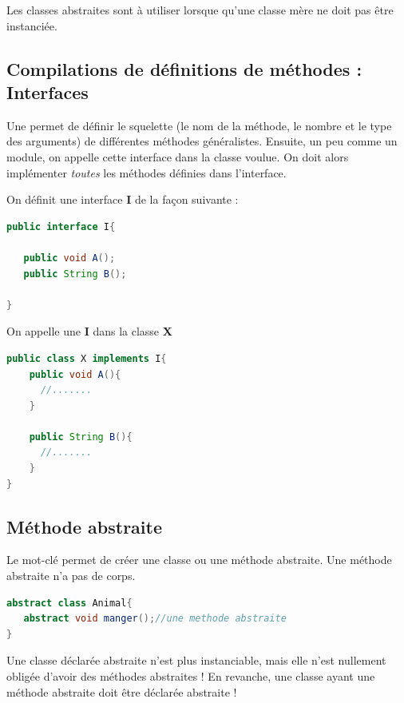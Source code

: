 \documentclass[a4paper,twoside]{article}
\begin{document}
\begin{remarque}
Les classes abstraites sont à utiliser lorsque qu'une classe mère ne doit pas être instanciée.
\end{remarque}

\subsection{Compilations de définitions de méthodes : Interfaces}\label{sec:interface}
Une  permet de définir le squelette (le nom de la méthode, le nombre et le type des arguments) de différentes méthodes généralistes. Ensuite, un peu comme un module, on appelle cette interface dans la classe voulue. On doit alors implémenter \textit{toutes} les méthodes définies dans l'interface.

On définit une interface \textbf{I} de la façon suivante :
\begin{lstlisting}[language=java]
public interface I{
 
   public void A();
   public String B();
 
}
\end{lstlisting}

On appelle une  \textbf{I} dans la classe \textbf{X}
\begin{lstlisting}[language=java]
public class X implements I{
    public void A(){
      //.......
    }
 
    public String B(){
      //.......
    }
}
\end{lstlisting}

\subsection{Méthode abstraite}\label{sec:methode_abstraite}
Le mot-clé  permet de créer une classe ou une méthode abstraite. Une méthode abstraite n'a pas de corps.

\begin{lstlisting}[language=java]
abstract class Animal{
   abstract void manger();//une methode abstraite
}
\end{lstlisting}

\begin{remarque}
Une classe déclarée abstraite n'est plus instanciable, mais elle n'est nullement obligée d'avoir des méthodes abstraites ! En revanche, une classe ayant une méthode abstraite doit être déclarée abstraite ! 
\end{remarque}
\end{document}
